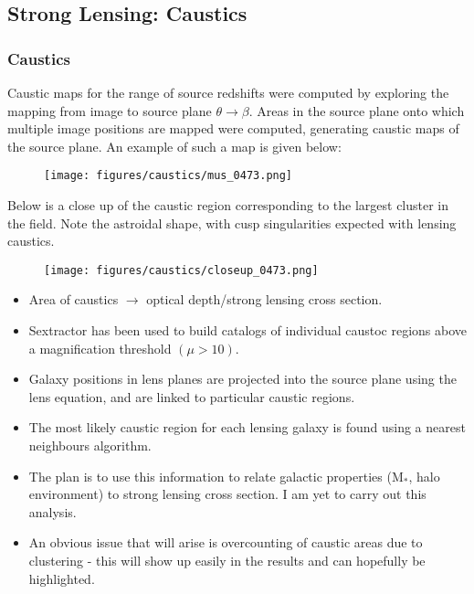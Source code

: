 \documentclass{beamer}
\begin{document}
  \subsection{Strong Lensing: Caustics}

  \begin{frame}
    \frametitle{\sc Caustics}
    Caustic maps for the range of source redshifts were computed by exploring the mapping from image to source plane $\theta \rightarrow \beta$. Areas in the source plane onto which multiple image positions are mapped were computed, generating caustic maps of the source plane. An example of such a map is given below:

    \begin{figure}
      \centering
      \texttt{[image: figures/caustics/mus\_0473.png]}
    \end{figure}
  \end{frame}

  \begin{frame}
    Below is a close up of the caustic region corresponding to the largest cluster in the field. Note the astroidal shape, with cusp singularities expected with lensing caustics.

    \begin{figure}
      \centering
      \texttt{[image: figures/caustics/closeup\_0473.png]}
    \end{figure}
  \end{frame}

  \begin{frame}
    \begin{itemize}
      \item Area of caustics $\rightarrow$ optical depth/strong lensing cross section.
      \item Sextractor has been used to build catalogs of individual caustoc regions above a magnification threshold $\left( \mu > 10 \right)$.
      \item Galaxy positions in lens planes are projected into the source plane using the lens equation, and are linked to particular caustic regions.
      \item The most likely caustic region for each lensing galaxy is found using a nearest neighbours algorithm.
    \end{itemize}
  \end{frame}

  \begin{frame}
    \begin{itemize}
      \item The plan is to use this information to relate galactic properties (M$_{*}$, halo environment) to strong lensing cross section. I am yet to carry out this analysis.
      \item An obvious issue that will arise is overcounting of caustic areas due to clustering - this will show up easily in the results and can hopefully be highlighted.
    \end{itemize}
  \end{frame}
\end{document}

